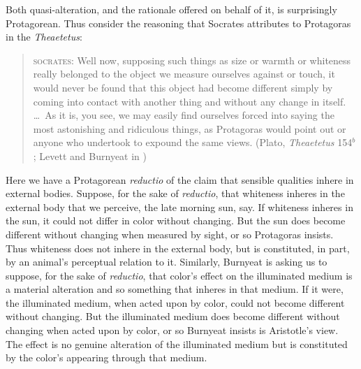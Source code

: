 Both quasi-alteration, and the rationale offered on behalf of it, is surprisingly Protagorean. Thus consider the reasoning that Socrates attributes to Protagoras in the \emph{Theaetetus}:
\begin{quote}
	\textsc{socrates}: Well now, supposing such things as size or warmth or whiteness really belonged to the object we measure ourselves against or touch, it would never be found that this object had become different simply by coming into contact with another thing and without any change in itself. \ldots\ As it is, you see, we may easily find ourselves forced into saying the most astonishing and ridiculous things, as Protagoras would point out or anyone who undertook to expound the same views. (Plato, \emph{Theaetetus} 154\( ^{b} \); Levett and Burnyeat in \citealt[171]{Cooper:1997fk})
\end{quote} 
Here we have a Protagorean \emph{reductio} of the claim that sensible qualities inhere in external bodies. Suppose, for the sake of \emph{reductio}, that whiteness inheres in the external body that we perceive, the late morning sun, say. If whiteness inheres in the sun, it could not differ in color without changing. But the sun does become different without changing when measured by sight, or so Protagoras insists. Thus whiteness does not inhere in the external body, but is constituted, in part, by an animal's perceptual relation to it. Similarly, Burnyeat is asking us to suppose, for the sake of \emph{reductio}, that color's effect on  the illuminated medium is a material alteration and so something that inheres in that medium. If it were, the illuminated medium, when acted upon by color, could not become different without changing. But the illuminated medium does become different without changing when acted upon by color, or so Burnyeat insists is Aristotle's view. The effect is no genuine alteration of the illuminated medium but is constituted by the color's appearing through that medium.

